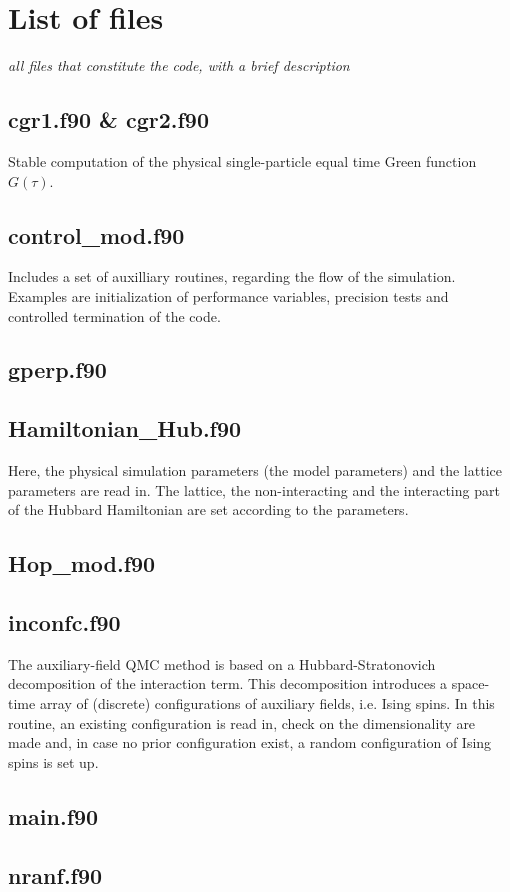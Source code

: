 \section{List of files}
\textit{all files that constitute the code, with a brief description}
\subsection{cgr1.f90 \& cgr2.f90}
Stable computation of the physical single-particle equal time Green function $G(\tau)$.
\subsection{control\_mod.f90}
Includes a set of auxilliary routines, regarding the flow of the simulation. 
Examples are initialization of performance variables, precision tests and controlled termination of the code.
\subsection{gperp.f90}
\subsection{Hamiltonian\_Hub.f90}
Here, the physical simulation parameters (the model parameters) and the lattice parameters are read in. 
The lattice, the non-interacting and the interacting part of the Hubbard Hamiltonian are set according to the parameters.
\subsection{Hop\_mod.f90}
\subsection{inconfc.f90}
The auxiliary-field QMC method is based on a Hubbard-Stratonovich decomposition of the interaction term. This decomposition introduces a space-time array of (discrete) configurations of auxiliary fields, i.e. Ising spins. 
In this routine, an existing configuration is read in, check on the dimensionality are made and, in case no prior configuration exist, a random configuration of Ising spins is set up.
\subsection{main.f90}
\subsection{nranf.f90}
